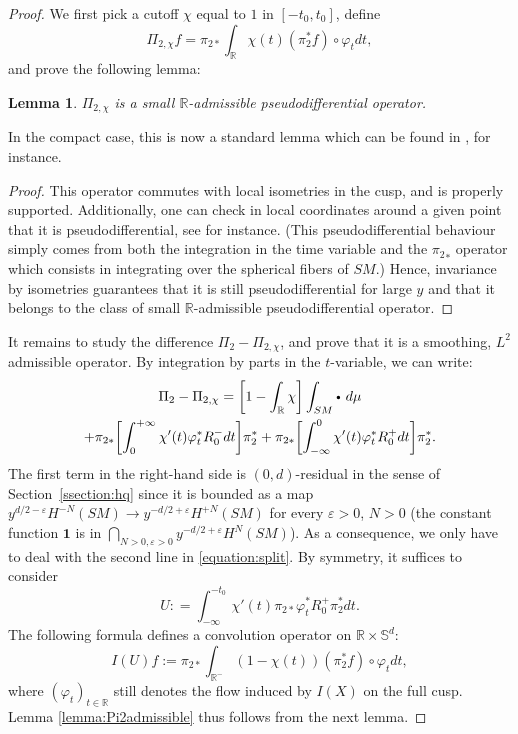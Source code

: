 \documentclass[JEP,XML,SOM,Unicode,NoFloatCountersInSection]{cedram}
\newcommand{\sbullet}{{\scriptscriptstyle\bullet}}
\newcommand{\csbullet}{{\raisebox{1pt}{$\sbullet$}}}
\newcommand{\R}{\mathbb{R}}
\newcommand{\Ss}{\mathbb{S}}
\newcommand{\eps}{\varepsilon}
\theoremstyle{plain}
\newtheorem{lemma}{Lemma}[section]
\theoremstyle{definition}
\begin{document}
\begin{proof}
We first pick a cutoff $\chi$ equal to $1$ in $[-t_0,t_0]$, define
\[
\Pi_{2,\chi} f = \pi_{2\ast}\int_\R \chi(t) (\pi_2^\ast f)\circ\varphi_t dt,
\]
and prove the following lemma:

\begin{lemma}
\label{lemma:admissibility}
$\Pi_{2,\chi}$ is a small $\R$-admissible pseudodifferential operator.
\end{lemma}

In the compact case, this is now a standard lemma which can be found in \cite{Guillarmou-17-1, Gouezel-Lefeuvre-19}, for instance.

\begin{proof}
This operator commutes with local isometries in the cusp, and is properly supported. Additionally, one can check in local coordinates around a given point that it is pseudodifferential, see \cite[\S 2.5]{Lefeuvre-these} for instance. (This pseudodifferential behaviour simply comes from both the integration in the time variable and the ${\pi_2}_*$ operator which consists in integrating over the spherical fibers of $SM$.) Hence, invariance by isometries guarantees that it is still pseudodifferential for large $y$ and that it belongs to the class of small $\R$-admissible pseudodifferential operator.
\end{proof}

It remains to study the difference $\Pi_2 - \Pi_{2,\chi}$, and prove that it is a smoothing, $L^2$ admissible operator. By integration by parts in the $t$-variable, we can write:
\begin{multline}
\label{equation:split}
\Pi_2 - \Pi_{2,\chi}= \biggl[1-\int_\R \chi\biggr] \int_{SM} \csbullet ~d \mu\\
+ \pi_{2\ast}\biggl[\int_0^{+\infty} \chi'(t) \varphi_t^\ast R_0^- dt\biggr]\pi_2^\ast + \pi_{2\ast}\biggl[\int_{-\infty}^0 \chi'(t) \varphi_t^\ast R_0^+ dt\biggr] \pi_2^\ast.
\end{multline}
The first term in the right-hand side is $(0,d)$-residual in the sense of Section~\ref{ssection:hq} since it is bounded as a map $y^{d/2-\eps} H^{-N}(SM) \to y^{-d/2+\eps}H^{+N}(SM)$ for every $\eps > 0$, $N > 0$ (the constant function $\mathbf{1}$ is in $\bigcap_{N > 0, \eps > 0} y^{-d/2+\eps}H^N(SM)$). As a consequence, we only have to deal with the second line in \eqref{equation:split}. By symmetry, it suffices to consider
\[
U : = \int_{-\infty}^{-t_0} \chi'(t) \pi_{2\ast} \varphi_t^\ast R_0^+ \pi_2^\ast dt.
\]
The following formula defines a convolution operator on $\R\times\Ss^d$:
\[
I(U) f := \pi_{2\ast}\int_{\R^-} (1-\chi(t)) (\pi_2^\ast f)\circ \varphi_t dt,
\]
where $(\varphi_t)_{t \in \R}$ still denotes the flow induced by $I(X)$ on the full cusp. Lemma \ref{lemma:Pi2admissible} thus follows from the next lemma.
\end{proof}
\end{document}
